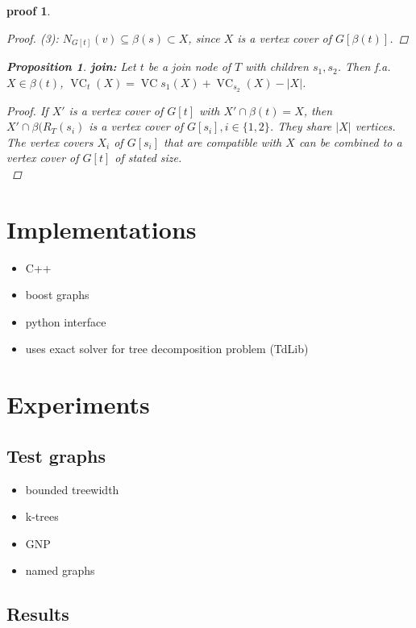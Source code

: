 \documentclass[11pt,a4paper]{article}
\newtheorem*{proposition}{Proposition}
\newtheorem*{proof_}{proof}
\DeclareMathOperator{\VC}{VC}
\begin{document}
\begin{proof_}
\begin{proof}
(3): $N_{G[t]}(v) \subseteq \beta(s) \subset X$, since $X$ is a vertex cover of $G[\beta(t)]$.
\end{proof}


\begin{proposition}
\textbf{join:} Let $t$ be a join node of $T$ with children $s_{1}, s_{2}$. Then f.a. $X \in \beta(t)$, $\VC_{t}(X) = \VC{s_{1}}(X) + \VC_{s_{2}}(X) - |X|$.
\end{proposition}

\begin{proof}
If $X'$ is a vertex cover of $G[t]$ with $X' \cap \beta(t) = X$, then $X' \cap \beta(R_{T}(s_{i})$ is a vertex cover of $G[s_{i}], i \in \{1,2\}$. They share $|X|$ vertices. The vertex covers $X_{i}$ of $G[s_{i}]$ that are compatible with $X$ can be combined to a vertex cover of $G[t]$ of stated size.  \\
\end{proof}
\end{proof_}

\section{Implementations}

\begin{itemize}
\item C++
\item boost graphs
\item python interface
\item uses exact solver for tree decomposition problem (TdLib)
\end{itemize}

\section{Experiments}

\subsection{Test graphs}

\begin{itemize}
\item bounded treewidth
\item k-trees
\item GNP
\item named graphs
\end{itemize}

\subsection{Results}
\end{document}
